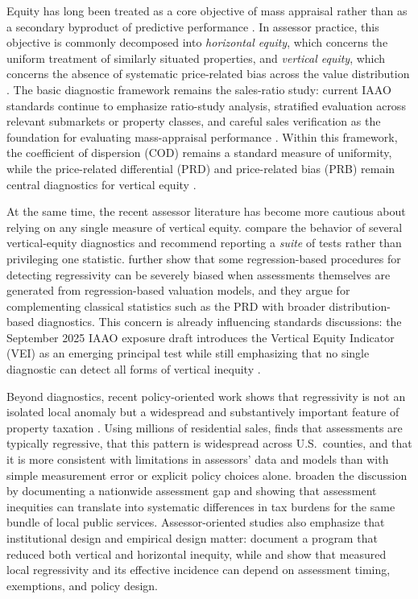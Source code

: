 \documentclass[12pt, draft]{article}
\theoremstyle{plain}
\theoremstyle{definition}
\newcommand{\1}{\mathbf{1}}
\begin{document}
Equity has long been treated as a core objective of mass appraisal rather than as a secondary byproduct of predictive performance \cite{IAAO2013Ratio,IAAO2025Mass,Quintos2014}. In assessor practice, this objective is commonly decomposed into \emph{horizontal equity}, which concerns the uniform treatment of similarly situated properties, and \emph{vertical equity}, which concerns the absence of systematic price-related bias across the value distribution \cite{10578d49-78f8-3ef9-8277-9b6add2bd071,cornia2006property,McMillenSingh2023}. The basic diagnostic framework remains the sales-ratio study: current IAAO standards continue to emphasize ratio-study analysis, stratified evaluation across relevant submarkets or property classes, and careful sales verification as the foundation for evaluating mass-appraisal performance \cite{IAAO2013Ratio,IAAO2020SalesVerification,IAAO2025Mass}. Within this framework, the coefficient of dispersion (COD) remains a standard measure of uniformity, while the price-related differential (PRD) and price-related bias (PRB) remain central diagnostics for vertical equity \cite{IAAO2013Ratio,IAAO2025Mass}.

At the same time, the recent assessor literature has become more cautious about relying on any single measure of vertical equity. \textcite{IAAO2023VerticalReview} compare the behavior of several vertical-equity diagnostics and recommend reporting a \emph{suite} of tests rather than privileging one statistic. \textcite{McMillenSingh2023} further show that some regression-based procedures for detecting regressivity can be severely biased when assessments themselves are generated from regression-based valuation models, and they argue for complementing classical statistics such as the PRD with broader distribution-based diagnostics. This concern is already influencing standards discussions: the September 2025 IAAO exposure draft introduces the Vertical Equity Indicator (VEI) as an emerging principal test while still emphasizing that no single diagnostic can detect all forms of vertical inequity \cite{IAAO2025ExposureRatio}.

Beyond diagnostics, recent policy-oriented work shows that regressivity is not an isolated local anomaly but a widespread and substantively important feature of property taxation \cite{Berry2021,AvenancioLeonHoward2022}. Using millions of residential sales, \textcite{Berry2021} finds that assessments are typically regressive, that this pattern is widespread across U.S.\ counties, and that it is more consistent with limitations in assessors' data and models than with simple measurement error or explicit policy choices alone. \textcite{AvenancioLeonHoward2022} broaden the discussion by documenting a nationwide assessment gap and showing that assessment inequities can translate into systematic differences in tax burdens for the same bundle of local public services. Assessor-oriented studies also emphasize that institutional design and empirical design matter: \textcite{ScottDaigle2022} document a program that reduced both vertical and horizontal inequity, while \textcite{Rakow2023} and \textcite{Rakow2024} show that measured local regressivity and its effective incidence can depend on assessment timing, exemptions, and policy design.
\end{document}
